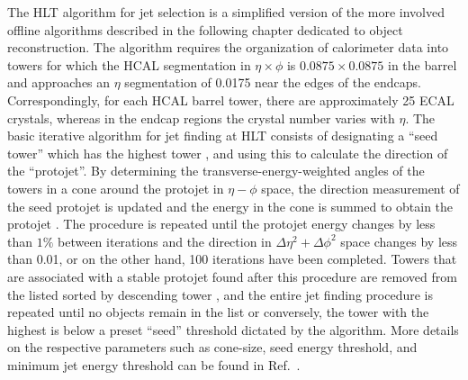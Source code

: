 The HLT algorithm for jet selection is a simplified version of the more involved offline algorithms described in the following chapter dedicated to object reconstruction. The algorithm requires the organization of calorimeter data into towers for which the HCAL segmentation in $\eta \times \phi$ is $0.0875\times 0.0875$ in the barrel and approaches an $\eta$ segmentation of 0.0175 near the edges of the endcaps. Correspondingly, for each HCAL barrel tower, there are approximately 25 ECAL crystals, whereas in the endcap regions the crystal number varies with $\eta$. The basic iterative algorithm for jet finding at HLT consists of designating a ``seed tower'' which has the highest tower \Et, and using this to calculate the direction of the ``protojet''. By determining the transverse-energy-weighted angles of the towers in a cone around the protojet in $\eta-\phi$ space, the direction measurement of the seed protojet is updated and the energy in the cone is summed to obtain the protojet \Et. The procedure is repeated until the protojet energy changes by less than $1\%$ between iterations and the direction in $\Delta\eta^2+\Delta\phi^2$ space changes by less than 0.01, or on the other hand, 100 iterations have been completed. Towers that are associated with a stable protojet found after this procedure are removed from the listed sorted by descending tower \Et, and the entire jet finding procedure is repeated until no objects remain in the list or conversely, the tower with the highest \Et is below a preset ``seed'' threshold dictated by the algorithm. More details on the respective parameters such as cone-size, seed energy threshold, and minimum jet energy threshold can be found in Ref.~\cite{Cittolin:578006}.


